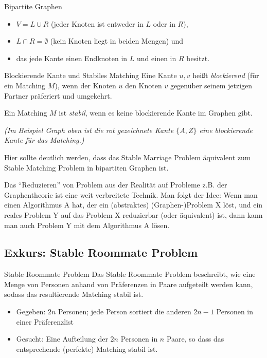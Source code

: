 \documentclass{panikzettel}
\begin{document}
{\begin{halfboxr}
\begin{defi}{Bipartite Graphen}
	\begin{itemize}
		\item $V = L \cup R$ (jeder Knoten ist entweder in $L$ oder in $R$),
		\item $L \cap R = \emptyset$ (kein Knoten liegt in beiden Mengen) und 
		\item das jede Kante einen Endknoten in $L$ und einen in $R$ besitzt.
	\end{itemize}
	\end{defi}
\end{halfboxr}

\begin{defi}{Blockierende Kante und Stabiles Matching}
	Eine Kante ${u,v}$ heißt \emph{blockierend} (für ein Matching $M$), wenn der Knoten $u$ den Knoten $v$ gegenüber seinem jetzigen Partner präferiert und umgekehrt.
	
	Ein Matching $M$ ist \emph{stabil}, wenn es keine blockierende Kante im Graphen gibt.
	
	\textit{(Im Beispiel Graph oben ist die rot gezeichnete Kante $\{A,Z\}$ eine blockierende Kante für das Matching.)}
\end{defi}

Hier sollte deutlich werden, dass das Stable Marriage Problem äquivalent zum Stable Matching Problem in bipartiten Graphen ist.

Das ``Reduzieren'' von Problem aus der Realität auf Probleme z.B. der Graphentheorie ist eine weit verbreitete Technik. Man folgt der Idee: Wenn man einen Algorithmus A hat, der ein (abstraktes) (Graphen-)Problem X löst, und ein reales Problem Y auf das Problem X reduzierbar (oder äquivalent) ist, dann kann man auch Problem Y mit dem Algorithmus A lösen.

\subsection{Exkurs: Stable Roommate Problem}

\begin{halfboxl}
	\vspace{-\baselineskip}
	\begin{defi}{Stable Roommate Problem}
		Das Stable Roommate Problem beschreibt, wie eine Menge von Personen anhand von Präferenzen in Paare aufgeteilt werden kann, sodass das resultierende Matching stabil ist.\\
		
		\begin{itemize}
			\item Gegeben: $2n$ Personen; jede Person sortiert die anderen $2n-1$ Personen in einer Präferenzlist
			\item Gesucht: Eine Aufteilung der $2n$ Personen in $n$ Paare, so dass das entsprechende (perfekte) Matching stabil ist.
		\end{itemize}
	

\end{defi}
\end{halfboxl}}
\end{document}
